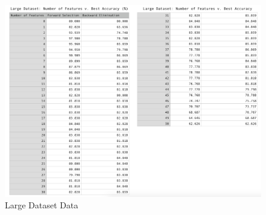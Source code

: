 \documentclass{article}
\begin{document}
\begin{figure}
  \includegraphics[width=\textwidth,height=\textheight,keepaspectratio]{LargeTestData.png}  
  \caption{Large Dataset Data}
\end{figure}






\end{document}
